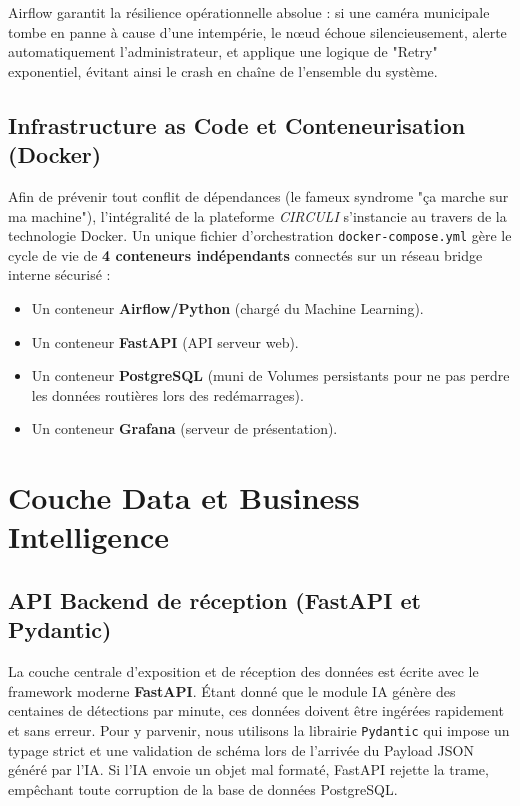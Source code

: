 Airflow garantit la résilience opérationnelle absolue : si une caméra municipale tombe en panne à cause d'une intempérie, le nœud échoue silencieusement, alerte automatiquement l'administrateur, et applique une logique de "Retry" exponentiel, évitant ainsi le crash en chaîne de l'ensemble du système.

\subsection{Infrastructure as Code et Conteneurisation (Docker)}
Afin de prévenir tout conflit de dépendances (le fameux syndrome "ça marche sur ma machine"), l'intégralité de la plateforme \textit{CIRCULI} s'instancie au travers de la technologie Docker. Un unique fichier d'orchestration \texttt{docker-compose.yml} gère le cycle de vie de \textbf{4 conteneurs indépendants} connectés sur un réseau bridge interne sécurisé :
\begin{itemize}
    \item Un conteneur \textbf{Airflow/Python} (chargé du Machine Learning).
    \item Un conteneur \textbf{FastAPI} (API serveur web).
    \item Un conteneur \textbf{PostgreSQL} (muni de Volumes persistants pour ne pas perdre les données routières lors des redémarrages).
    \item Un conteneur \textbf{Grafana} (serveur de présentation).
\end{itemize}

\section{Couche Data et Business Intelligence}

\subsection{API Backend de réception (FastAPI et Pydantic)}
La couche centrale d'exposition et de réception des données est écrite avec le framework moderne \textbf{FastAPI}. Étant donné que le module IA génère des centaines de détections par minute, ces données doivent être ingérées rapidement et sans erreur. 
Pour y parvenir, nous utilisons la librairie \texttt{Pydantic} qui impose un typage strict et une validation de schéma lors de l'arrivée du Payload JSON généré par l'IA. Si l'IA envoie un objet mal formaté, FastAPI rejette la trame, empêchant toute corruption de la base de données PostgreSQL.

